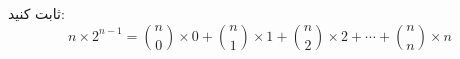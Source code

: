 \EXERCISE
ثابت کنید:
$$n \times 2^{n-1} = \binom{n}{0} \times 0 + \binom{n}{1} \times 1 + \binom{n}{2} \times 2 + \cdots + \binom{n}{n} \times n$$